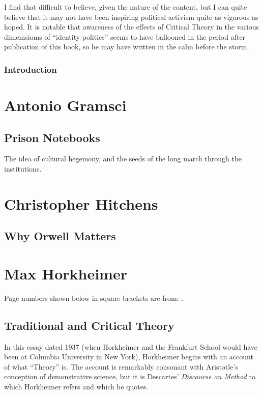 \documentclass[10pt,titlepage]{book}
\begin{document}
I find that difficult to believe, given the nature of the content, but I can quite believe that it may not have been inspiring political activism quite as vigorous as hoped.
It is notable that awareness of the effects of Critical Theory in the various dimemsioms of ``identity politics'' seems to have ballooned in the period after publication of this book, so he may have written in the calm before the storm.

\subsubsection{Introduction}


\section{Antonio Gramsci}

\subsection{Prison Notebooks \cite{gramsci-notes}}

The idea of cultural hegemony, and the seeds of the long march through the institutions.

\section{Christopher Hitchens}

\subsection{Why Orwell Matters\cite{hitchens-wom}}

\section{Max Horkheimer}

Page numbers shown below in square brackets are from: \cite{horkheimer-crit}.

\subsection{Traditional and Critical Theory}

In this essay \cite{horkheimer-trad, horkheimer-crit} dated 1937 (when Horkheimer and the Frankfurt School would have been at Columbia University in New York), Horkheimer begins with an account of what ``Theory'' is.
The account is remarkably consonant with Aristotle's conception of demonstrative science, but it is Descartes' \emph{Discourse on Method}\cite{descartesDOM} to which Horkheimer refers and which he quotes.
\end{document}
